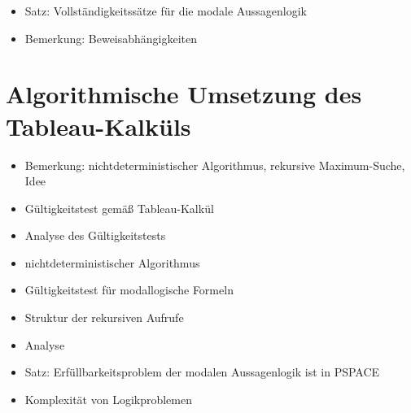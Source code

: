 \documentclass[8pt,fleqn,a4paper,twoside]{article}
\begin{document}
\begin{multicols}{2}
    \begin{itemize}
      \item Satz: Vollständigkeitssätze für die modale Aussagenlogik
      \item Bemerkung: Beweisabhängigkeiten
    \end{itemize}


  \section{Algorithmische Umsetzung des Tableau-Kalküls} %
  \label{sec:algorithmische_umsetzung_des_tableau_kalküls}

    \begin{itemize}
      \item Bemerkung: nichtdeterministischer Algorithmus, rekursive Maximum-Suche, Idee
      \item Gültigkeitstest gemäß Tableau-Kalkül
      \item Analyse des Gültigkeitstests
      \item nichtdeterministischer Algorithmus
      \item Gültigkeitstest für modallogische Formeln
      \item Struktur der rekursiven Aufrufe
      \item Analyse
      \item Satz: Erfüllbarkeitsproblem der modalen Aussagenlogik ist in PSPACE
      \item Komplexität von Logikproblemen
    \end{itemize}



\end{multicols}
\end{document}
